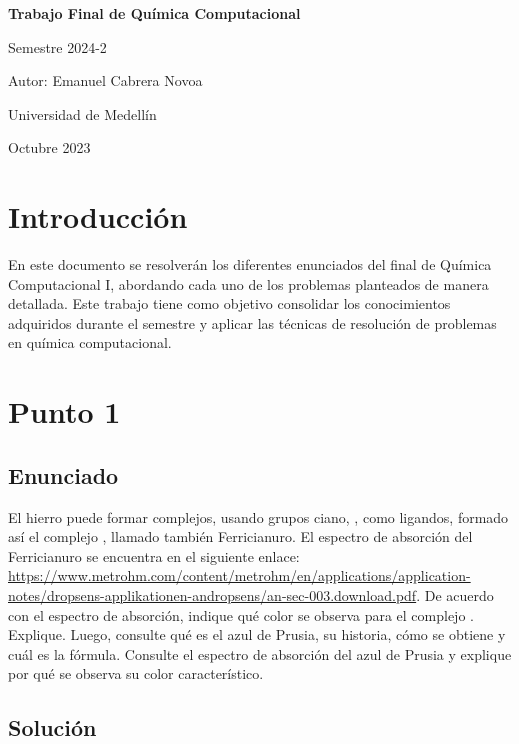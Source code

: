 \documentclass[a4paper,12pt]{article}
\begin{document}
\begin{titlepage}
    \centering
    \vspace*{1cm}
    {\huge \bfseries Trabajo Final de Química Computacional\par}
    \vspace*{2cm}
    {\Large Semestre 2024-2\par}
    \vspace{2cm}
    {\large Autor: Emanuel Cabrera Novoa\par}
    \vfill
    {\large Universidad de Medellín\par}
    \vspace{0.8cm}
    {\large Octubre 2023\par}
\end{titlepage}

\section*{Introducción}
En este documento se resolverán los diferentes enunciados del final de Química Computacional I, abordando cada uno de los problemas planteados de manera detallada. Este trabajo tiene como objetivo consolidar los conocimientos adquiridos durante el semestre y aplicar las técnicas de resolución de problemas en química computacional.

\section{Punto 1}
\subsection*{Enunciado}
El hierro puede formar complejos, usando grupos ciano, , como ligandos, formado así el complejo
, llamado también Ferricianuro. El espectro de absorción del Ferricianuro se encuentra en el siguiente enlace:  
\url{https://www.metrohm.com/content/metrohm/en/applications/application-notes/dropsens-applikationen-andropsens/an-sec-003.download.pdf}.  
De acuerdo con el espectro de absorción, indique qué color se observa para el complejo . Explique. Luego, consulte qué es el azul de Prusia, su historia, cómo se obtiene y cuál es la fórmula. Consulte el espectro de absorción del azul de Prusia y explique por qué se observa su color característico.

\subsection*{Solución}
\end{document}
